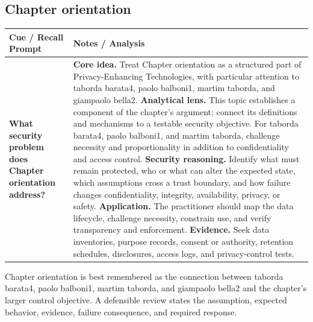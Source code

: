 \documentclass[11pt]{article}
\newcommand{\CornellHeader}{%
\rowcolor{Navy}\color{white}\bfseries Cue / Recall Prompt & \color{white}\bfseries Notes / Analysis\\\hline}
\newcommand{\CornellRow}[2]{%
\cellcolor{CueGray}\RaggedRight\textbf{#1} & \RaggedRight #2\\\hline}
\begin{document}
\subsection*{Chapter orientation}
\begin{longtable}{>{\RaggedRight\arraybackslash}p{}|>{\RaggedRight\arraybackslash}p{}}
\CornellHeader
\CornellRow{What security problem does Chapter orientation address?}{\textbf{Core idea.} Treat Chapter orientation as a structured part of Privacy-Enhancing Technologies, with particular attention to taborda barata4, paolo balboni1, martim taborda, and giampaolo bella2. \textbf{Analytical lens.} This topic establishes a component of the chapter's argument; connect its definitions and mechanisms to a testable security objective. For taborda barata4, paolo balboni1, and martim taborda, challenge necessity and proportionality in addition to confidentiality and access control. \textbf{Security reasoning.} Identify what must remain protected, who or what can alter the expected state, which assumptions cross a trust boundary, and how failure changes confidentiality, integrity, availability, privacy, or safety. \textbf{Application.} The practitioner should map the data lifecycle, challenge necessity, constrain use, and verify transparency and enforcement. \textbf{Evidence.} Seek data inventories, purpose records, consent or authority, retention schedules, disclosures, access logs, and privacy-control tests.}
\end{longtable}
\begin{topicsummary}
Chapter orientation is best remembered as the connection between taborda barata4, paolo balboni1, martim taborda, and giampaolo bella2 and the chapter's larger control objective. A defensible review states the assumption, expected behavior, evidence, failure consequence, and required response.
\end{topicsummary}
\end{document}

